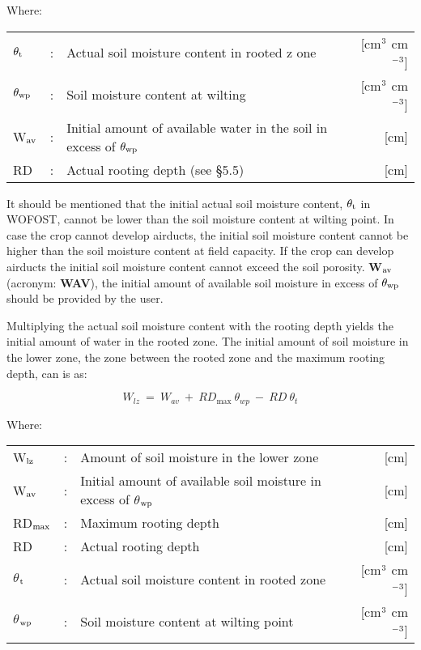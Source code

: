 Where:\\[5pt]
\begin{tabularx}{\textwidth}{llXr}
	$\theta_{{\rm t}}$ &:& Actual soil moisture content in rooted z
	one  & [cm$^{{\rm 3}}$ cm$^{{\rm -3}}$]\\
	$\theta_{{\rm wp}}$ &:& Soil moisture content at wilting   & [cm$^{{\rm 3}}$ cm$^{{\rm -3}}$]\\
	W$_{{\rm av}}$ &:& Initial amount of available water in the soil 
	in excess of $\theta_{{\rm wp}}$ & [cm]\\
	RD &:& Actual rooting depth (see \S 5.5) & [cm]\\
\end{tabularx}

It should be mentioned that the initial actual soil moisture content, $\theta_{{\rm t}}$ in WOFOST, cannot be lower than the soil moisture content at wilting point. In case the crop cannot develop airducts, the initial soil moisture content cannot be higher than the soil moisture content at field capacity. If the crop can develop airducts the initial soil moisture content cannot exceed the soil porosity. {\bf W$_{{\rm av}}$} (acronym: {\bf WAV}), the initial amount of available soil moisture in excess of $\theta_{{\rm wp}}$ should be provided by the user. 

Multiplying the actual soil moisture content with the rooting depth yields the initial amount of water in the rooted zone. The initial amount of soil moisture in the lower zone, the zone between the rooted zone and the maximum rooting depth, can is as:

\begin{equation}
\label{eq:6.19}
W_{lz} ~ =~ W _{av} ~+~ RD_{\max } ~\theta_{wp} ~-~RD~\theta_{t} 
\end{equation}

Where:\\[5pt]
\begin{tabularx}{\textwidth}{llXr}
	W$_{{\rm lz}}$ &:& Amount of soil moisture in the lower zone & [cm]\\
	W$_{{\rm av}}$ &:& Initial amount of available soil moisture 
	in excess of $\theta$$_{{\rm wp}}$ & [cm]\\
	RD$_{{\rm max}}$ &:& Maximum rooting depth & [cm]\\
	RD &:& Actual rooting depth & [cm]\\
	$\theta$$_{{\rm t}}$ &:& Actual soil moisture content in rooted zone  
	& [cm$^{{\rm 3}}$ cm$^{{\rm -3}}$]\\
	$\theta$$_{{\rm wp}}$ &:& Soil moisture content at wilting point  
	& [cm$^{{\rm 3}}$ cm$^{{\rm -3}}$]\\
\end{tabularx}

